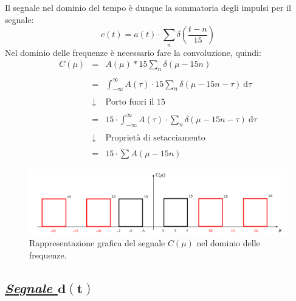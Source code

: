 \documentclass[a4paper]{article}
\begin{document}
	\noindent
	Il segnale nel dominio del tempo è dunque la sommatoria degli impulsi per il segnale:
	\begin{equation*}
		c\left(t\right) = a\left(t\right) \cdot \displaystyle\sum_{n} \delta\left(\dfrac{t-n}{15}\right)
	\end{equation*}
	Nel dominio delle frequenze è necessario fare la convoluzione, quindi:
	\begin{equation*}
		\begin{array}{lll}
			C\left(\mu\right) & = & A\left(\mu\right) * 15\displaystyle\sum_{n} \delta\left(\mu - 15n\right) \\
			\\
			& = & \displaystyle\int_{-\infty}^{\infty} A\left(\tau\right) \cdot 15\displaystyle\sum_{n} \delta\left(\mu - 15n - \tau\right) \: \mathrm{d}\tau \\
			\\
			& \downarrow & \text{Porto fuori il } 15 \\
			\\
			& = & 15 \cdot \displaystyle\int_{-\infty}^{\infty} A\left(\tau\right) \cdot \displaystyle\sum_{n} \delta\left(\mu - 15n - \tau\right) \: \mathrm{d}\tau \\
			\\
			& \downarrow & \text{Proprietà di setacciamento} \\
			\\
			& = & 15 \cdot \displaystyle\sum A\left(\mu - 15n\right)
		\end{array}
	\end{equation*}
	\begin{figure}[!htp]
		\centering
		\includegraphics[width=\textwidth]{img/fig_3.png}
		\caption*{Rappresentazione grafica del segnale $C\left(\mu\right)$ nel dominio delle frequenze.}
	\end{figure}\newpage

	\subsection*{\textcolor{Green4}{\underline{\textbf{\emph{Segnale $\boldsymbol{d\left(t\right)}$}}}}}
	
\end{document}

